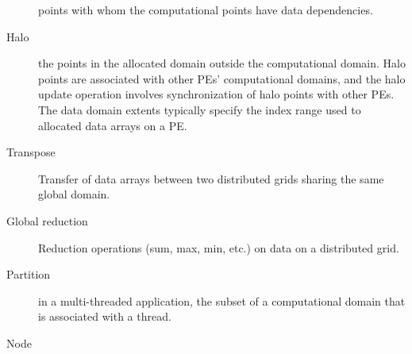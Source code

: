 \begin{description}
  points with whom the computational points have data dependencies.
\item[Halo] the points in the allocated domain outside the
  computational domain. Halo points are associated with other PEs'
  computational domains, and the halo update operation involves
  synchronization of halo points with other PEs. The data domain
  extents typically specify the index range used to allocated data
  arrays on a PE.
\item[Transpose] Transfer of data arrays between two distributed grids
  sharing the same global domain.
\item[Global reduction] Reduction operations (sum, max, min, etc.) on
  data on a distributed grid.
\item[Partition] in a multi-threaded application, the subset of a
  computational domain that is associated with a thread.
\item[Node]



\end{description}




